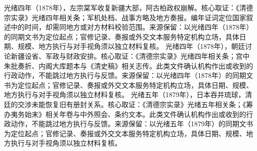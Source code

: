 光绪四年（1878年），左宗棠军收复新疆大部，阿古柏政权崩解。核心取证：《清德宗实录》光绪四年相关条；军机处档、战事方略及地方奏报。编年证词定位国家叙述中的时间，却需同地方或对方材料校验范围。来源保留：以光绪四年（1878年）的同期文书为定位起点；官修记录、奏报或外交文本服务特定机构立场，具体日期、规模、地方执行与对手视角须以独立材料复核。
光绪四年（1878年），朝廷讨论新疆设省、军政与财政安排。核心取证：《清德宗实录》光绪四年相关条；宫中朱批奏折、内阁大库题本与《清史稿》相关志传。此类文件确认机构作出或收到的行政动作，不能跳过地方执行与反馈。来源保留：以光绪四年（1878年）的同期文书为定位起点；官修记录、奏报或外交文本服务特定机构立场，具体日期、规模、地方执行与对手视角须以独立材料复核。
光绪五年（1879年），日本吞并琉球，清廷的交涉未能恢复旧有册封关系。核心取证：《清德宗实录》光绪五年相关条；《筹办夷务始末》相关年卷与中外照会、条约文本。此类文件确认机构作出或收到的行政动作，不能跳过地方执行与反馈。来源保留：以光绪五年（1879年）的同期文书为定位起点；官修记录、奏报或外交文本服务特定机构立场，具体日期、规模、地方执行与对手视角须以独立材料复核。
